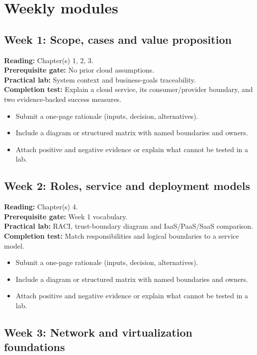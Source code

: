 \documentclass[10pt,letterpaper]{article}
\begin{document}
\section{Weekly modules}
\subsection{Week 1: Scope, cases and value proposition}
\textbf{Reading:} Chapter(s) 1, 2, 3.\\
\textbf{Prerequisite gate:} No prior cloud assumptions.\\
\textbf{Practical lab:} System context and business-goals traceability.\\
\textbf{Completion test:} Explain a cloud service, its consumer/provider boundary, and two evidence-backed success measures.
\begin{itemize}
\item Submit a one-page rationale (inputs, decision, alternatives).
\item Include a diagram or structured matrix with named boundaries and owners.
\item Attach positive and negative evidence or explain what cannot be tested in a lab.
\end{itemize}
\subsection{Week 2: Roles, service and deployment models}
\textbf{Reading:} Chapter(s) 4.\\
\textbf{Prerequisite gate:} Week 1 vocabulary.\\
\textbf{Practical lab:} RACI, trust-boundary diagram and IaaS/PaaS/SaaS comparison.\\
\textbf{Completion test:} Match responsibilities and logical boundaries to a service model.
\begin{itemize}
\item Submit a one-page rationale (inputs, decision, alternatives).
\item Include a diagram or structured matrix with named boundaries and owners.
\item Attach positive and negative evidence or explain what cannot be tested in a lab.
\end{itemize}
\subsection{Week 3: Network and virtualization foundations}
\end{document}
